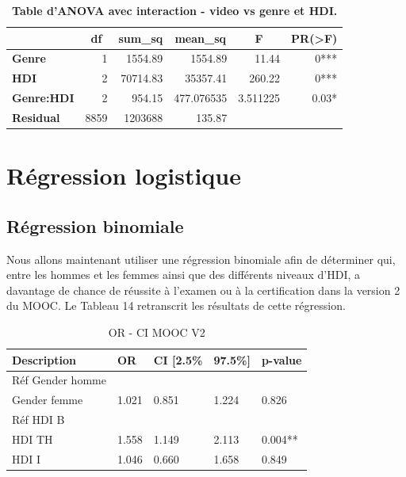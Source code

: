 \documentclass[12pt, a4paper, titlepage, table]{article}
\begin{document}
	\begin{table}[H]
		\centering
		\fontsize{12}{20}\selectfont
		\begin{tabular}{|l|r|r|r|r|r|}
			\hline
			\multicolumn{1}{|c|}{\textbf{}}&
			\multicolumn{1}{c|}{\textbf{df}}&
			\multicolumn{1}{c|}{\textbf{sum\_sq}}&
			\multicolumn{1}{c|}{\textbf{mean\_sq}}&
			\multicolumn{1}{c|}{\textbf{F}}&
			\multicolumn{1}{c|}{\textbf{PR(>F)}}\\
			\hline
				\textbf{Genre}&	1&	1554.89&	1554.89&	11.44&	0***\\
				\textbf{HDI}&	2&	70714.83&	35357.41&	260.22&	0***\\
				\textbf{Genre:HDI}&2&	954.15&	477.076535&	3.511225&0.03*\\
				\textbf{Residual}&	8859&	1203688&	135.87&	&	\\
			\hline
		\end{tabular}
	\caption{\textbf{Table d'ANOVA avec interaction - video vs genre et HDI.}}
\end{table}


\section{Régression logistique}
\subsection{Régression binomiale}
Nous allons maintenant utiliser une régression binomiale afin de déterminer qui, entre les hommes et les femmes ainsi que des
différents niveaux d'HDI, a davantage de chance de réussite à l'examen ou à la certification dans la version 2 du MOOC.
Le Tableau 14 retranscrit les résultats de cette régression.

	\begin{table}[H]
		\centering
		\begin{tabular}{@{}lllll@{}}
		\toprule
		Description & OR & CI [2.5\% & 97.5\%] & p-value \\
		\midrule
		Réf Gender homme & & & & \\
		Gender femme & 1.021 & 0.851 & 1.224 & 0.826 \\
		Réf HDI B & & & & \\
		HDI TH & 1.558 & 1.149 & 2.113 & 0.004** \\
		HDI I & 1.046 & 0.660 & 1.658 & 0.849 \\
		\bottomrule
		\end{tabular}
		\caption{OR - CI MOOC V2}
		\end{table}
\end{document}
